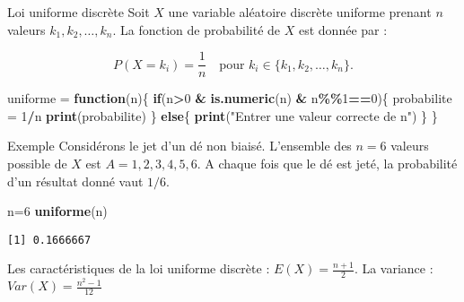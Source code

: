 \documentclass[
  ignorenonframetext,
]{beamer}
\newenvironment{Shaded}{\begin{snugshade}}{\end{snugshade}}
\newcommand{\ControlFlowTok}[1]{\textcolor[rgb]{0.13,0.29,0.53}{\textbf{#1}}}
\newcommand{\DecValTok}[1]{\textcolor[rgb]{0.00,0.00,0.81}{#1}}
\newcommand{\FunctionTok}[1]{\textcolor[rgb]{0.13,0.29,0.53}{\textbf{#1}}}
\newcommand{\NormalTok}[1]{#1}
\newcommand{\OtherTok}[1]{\textcolor[rgb]{0.56,0.35,0.01}{#1}}
\newcommand{\SpecialCharTok}[1]{\textcolor[rgb]{0.81,0.36,0.00}{\textbf{#1}}}
\newcommand{\StringTok}[1]{\textcolor[rgb]{0.31,0.60,0.02}{#1}}
\begin{document}
\begin{frame}[fragile]{Loi uniforme discrète}
\protect\hypertarget{loi-uniforme-discruxe8te}{}
Soit \(X\) une variable aléatoire discrète uniforme prenant \(n\)
valeurs \(k_1, k_2, \dots, k_n\). La fonction de probabilité de \(X\)
est donnée par :

\[P(X = k_i) = \frac{1}{n} \quad \text{pour } k_i \in \{k_1, k_2, \dots, k_n\}.\]

\begin{Shaded}
\begin{Highlighting}[]
\NormalTok{uniforme }\OtherTok{=} \ControlFlowTok{function}\NormalTok{(n)\{}
  \ControlFlowTok{if}\NormalTok{(n}\SpecialCharTok{\textgreater{}}\DecValTok{0} \SpecialCharTok{\&} \FunctionTok{is.numeric}\NormalTok{(n) }\SpecialCharTok{\&}\NormalTok{ n}\SpecialCharTok{\%\%}\DecValTok{1}\SpecialCharTok{==}\DecValTok{0}\NormalTok{)\{}
\NormalTok{    probabilite }\OtherTok{=} \DecValTok{1}\SpecialCharTok{/}\NormalTok{n}
    \FunctionTok{print}\NormalTok{(probabilite)}
\NormalTok{  \} }\ControlFlowTok{else}\NormalTok{\{}
    \FunctionTok{print}\NormalTok{(}\StringTok{"Entrer une valeur correcte de n"}\NormalTok{)}
\NormalTok{  \}}
\NormalTok{\}}
\end{Highlighting}
\end{Shaded}
\end{frame}

\begin{frame}[fragile]{Exemple}
\protect\hypertarget{exemple-4}{}
Considérons le jet d'un dé non biaisé. L'ensemble des \(n = 6\) valeurs
possible de \(X\) est \(A = {1, 2, 3, 4, 5, 6}\). A chaque fois que le
dé est jeté, la probabilité d'un résultat donné vaut \(1/6\).

\begin{Shaded}
\begin{Highlighting}[]
\NormalTok{n}\OtherTok{=}\DecValTok{6}
\FunctionTok{uniforme}\NormalTok{(n)}
\end{Highlighting}
\end{Shaded}

\begin{verbatim}
[1] 0.1666667
\end{verbatim}

Les caractéristiques de la loi uniforme discrète :
\(E(X) = \frac{n + 1}{2}\). La variance :
\(Var(X) = \frac{n^2 - 1}{12}\)
\end{frame}
\end{document}

